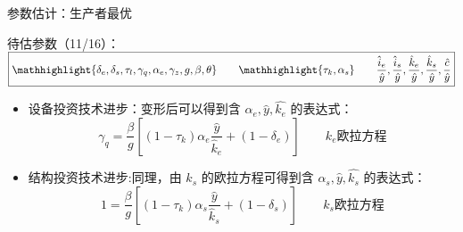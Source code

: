 \documentclass[aspectratio=169,10pt]{beamer}
\begin{document}
\begin{frame}{参数估计：生产者最优}

  \begin{block}{}
    \begin{center}
      待估参数（11/16）：$\boxed{\mathhighlight{
            \delta_e, \delta_s,  \tau_l, \gamma_q,  \alpha_e, \gamma_z, g, \beta, \theta} \qquad \mathhighlight{\tau_k, \alpha_s} \qquad   \dfrac{\hat{i}_e}{\hat{y}}, \dfrac{\hat{i}_s}{\hat{y}}, \dfrac{\hat{k}_e}{\hat{y}}, \dfrac{\hat{k}_s}{\hat{y}}, \dfrac{\hat{c}}{\hat{y}} }$
    \end{center}
  \end{block}

  \begin{itemize}
    \item[10.] 设备投资技术进步：变形后可以得到含 $\alpha_e, \hat y, \hat{k_e}$ 的表达式：
          \begin{equation}\label{eq:gamma_q}
            \gamma_q = \dfrac{\beta}{g}\left[(1-\tau_k) \alpha_e \dfrac{\hat y}{\hat k_e} + (1-\delta_e) \right] \qquad \boxed{k_e \text{欧拉方程}}
          \end{equation}
    \item[11.] 结构投资技术进步:同理，由 $k_s$ 的欧拉方程可得到含 $\alpha_s, \hat y, \hat{k_s}$ 的表达式：
          \begin{equation}
            1 = \dfrac{\beta}{g}\left[(1-\tau_k) \alpha_s \dfrac{\hat y}{\hat k_s} + (1-\delta_{s}) \right] \qquad \boxed{k_s \text{欧拉方程}}
          \end{equation}
  \end{itemize}

\end{frame}
\end{document}
